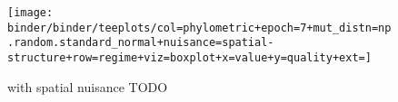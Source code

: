 \begin{figure*}
  \centering
  \texttt{[image: binder/binder/teeplots/col=phylometric+epoch=7+mut\_distn=np.random.standard\_normal+nuisance=spatial-structure+row=regime+viz=boxplot+x=value+y=quality+ext=]}
  \caption{with spatial nuisance TODO}
  \label{fig:reconstructed-tree-phylometrics-with-spatial-nuisance}
\end{figure*}
